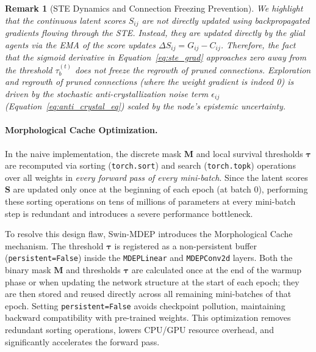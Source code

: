 \documentclass[11pt, a4paper]{article}
\newtheorem{remark}{Remark}
\begin{document}
\begin{remark}[STE Dynamics and Connection Freezing Prevention]
We highlight that the continuous latent scores $S_{ij}$ are not directly updated using backpropagated gradients flowing through the STE. Instead, they are updated directly by the glial agents via the EMA of the score updates $\Delta S_{ij} = G_{ij} - C_{ij}$. Therefore, the fact that the sigmoid derivative in Equation~\ref{eq:ste_grad} approaches zero away from the threshold $\tau_b^{(t)}$ does not freeze the regrowth of pruned connections. Exploration and regrowth of pruned connections (where the weight gradient is indeed 0) is driven by the stochastic anti-crystallization noise term $\epsilon_{ij}$ (Equation~\ref{eq:anti_crystal_eq}) scaled by the node's epistemic uncertainty.
\end{remark}

\paragraph{Morphological Cache Optimization.}
In the naive implementation, the discrete mask $\bm{M}$ and local survival thresholds $\bm{\tau}$ are recomputed via sorting (\texttt{torch.sort}) and search (\texttt{torch.topk}) operations over all weights in \emph{every forward pass of every mini-batch}. Since the latent scores $\bm{S}$ are updated only once at the beginning of each epoch (at batch 0), performing these sorting operations on tens of millions of parameters at every mini-batch step is redundant and introduces a severe performance bottleneck.

To resolve this design flaw, Swin-MDEP introduces the Morphological Cache mechanism. The threshold $\bm{\tau}$ is registered as a non-persistent buffer (\texttt{persistent=False}) inside the \texttt{MDEPLinear} and \texttt{MDEPConv2d} layers. Both the binary mask $\bm{M}$ and thresholds $\bm{\tau}$ are calculated once at the end of the warmup phase or when updating the network structure at the start of each epoch; they are then stored and reused directly across all remaining mini-batches of that epoch. Setting \texttt{persistent=False} avoids checkpoint pollution, maintaining backward compatibility with pre-trained weights. This optimization removes redundant sorting operations, lowers CPU/GPU resource overhead, and significantly accelerates the forward pass.

\end{document}
